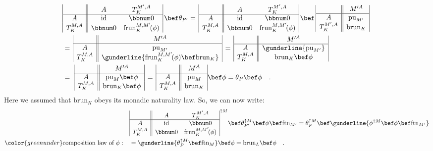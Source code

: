 \begin{align*}
 & \begin{array}{|c||cc|}
 & A & T_{K}^{M^{\prime},A}\\
\hline A & \text{id} & \bbnum 0\\
T_{K}^{M,A} & \bbnum 0 & \text{frun}_{K}^{M,M^{\prime}}\!(\phi)
\end{array}\,\bef\theta_{P^{\prime}}=\,\begin{array}{|c||cc|}
 & A & T_{K}^{M^{\prime},A}\\
\hline A & \text{id} & \bbnum 0\\
T_{K}^{M,A} & \bbnum 0 & \text{frun}_{K}^{M,M^{\prime}}\!(\phi)
\end{array}\,\bef\,\begin{array}{|c||c|}
 & M^{\prime A}\\
\hline A & \text{pu}_{M^{\prime}}\\
T_{K}^{M^{\prime},A} & \text{brun}_{K}
\end{array}\,\\
 & =\,\begin{array}{|c||c|}
 & M^{\prime A}\\
\hline A & \text{pu}_{M^{\prime}}\\
T_{K}^{M,A} & \gunderline{\text{frun}_{K}^{M,M^{\prime}}\!(\phi)\bef\text{brun}_{K}}
\end{array}\,=\,\begin{array}{|c||c|}
 & M^{\prime A}\\
\hline A & \gunderline{\text{pu}_{M^{\prime}}}\\
T_{K}^{M,A} & \text{brun}_{K}\bef\phi
\end{array}\\
 & =\,\,\begin{array}{|c||c|}
 & M^{\prime A}\\
\hline A & \text{pu}_{M}\bef\phi\\
T_{K}^{M,A} & \text{brun}_{K}\bef\phi
\end{array}\,=\,\begin{array}{|c||c|}
 & M^{A}\\
\hline A & \text{pu}_{M}\\
T_{K}^{M,A} & \text{brun}_{K}
\end{array}\bef\phi=\theta_{P}\bef\phi\quad.
\end{align*}
Here we assumed that $\text{brun}_{K}$ obeys its monadic naturality
law. So, we can now write:
\begin{align*}
 & \begin{array}{|c||cc|}
 & A & T_{K}^{M^{\prime},A}\\
\hline A & \text{id} & \bbnum 0\\
T_{K}^{M,A} & \bbnum 0 & \text{frun}_{K}^{M,M^{\prime}}\!(\phi)
\end{array}^{\uparrow M}\bef\theta_{P^{\prime}}^{\uparrow M}\bef\phi\bef\text{ftn}_{M^{\prime}}=\theta_{P}^{\uparrow M}\bef\gunderline{\phi^{\uparrow M}\bef\phi\bef\text{ftn}_{M^{\prime}}}\\
{\color{greenunder}\text{composition law of }\phi:}\quad & =\gunderline{\theta_{P}^{\uparrow M}\bef\text{ftn}_{M}}\bef\phi=\text{brun}_{L}\bef\phi\quad.
\end{align*}

